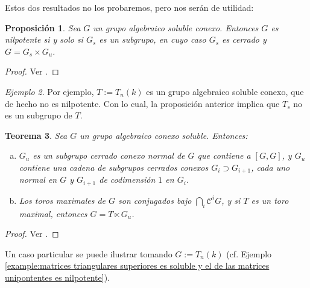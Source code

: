 \documentclass[spanish,12pt]{amsart}
\newtheorem{theorem}{Teorema}[section]
\newtheorem{proposition}[theorem]{Proposición}
\theoremstyle{definition}
\theoremstyle{remark}
\newtheorem{example}[theorem]{Ejemplo}
\numberwithin{equation}{section}
\begin{document}
Estos dos resultados no los probaremos, pero nos serán de utilidad:

\begin{proposition}\label{proposition:19.2}
Sea $G$ un grupo algebraico soluble conexo. Entonces $G$ es nilpotente si y solo si $G_s$ es un subgrupo, en cuyo caso $G_s$ es cerrado y $G = G_s \times G_u$.
\end{proposition}
\begin{proof}
Ver \cite[\S 19.2]{humphreys2012linearAlgebraicGroups}.
\end{proof}

\begin{example}\label{ejemplo:T es soluble conexo pero no nilpotente luego T_s no es un grupo}
Por ejemplo, $T := T_n (k)$ es un grupo algebraico soluble conexo, que de hecho no es nilpotente. Con lo cual, la proposición anterior implica que $T_s$ no es un subgrupo de $T$.
\end{example}

\begin{theorem}\label{th:19.3}
Sea $G$ un grupo algebraico conexo soluble. Entonces:
\begin{enumerate}[(a)]
\item $G_u$ es un subgrupo cerrado conexo normal de $G$ que contiene a $[G,G]$, y $G_u$ contiene una cadena de subgrupos cerrados conexos $G_i \supset G_{i+1}$, cada uno normal en $G$ y $G_{i+1}$ de codimensión $1$ en $G_i$.
\item Los toros maximales de $G$ son conjugados bajo $\bigcap_i \mathcal C^i G$, y si $T$ es un toro maximal, entonces $G = T \ltimes G_u$.
\end{enumerate}
\end{theorem}
\begin{proof}
Ver \cite[\S 19.3]{humphreys2012linearAlgebraicGroups}.
\end{proof}

Un caso particular se puede ilustrar tomando $G := T_n (k)$ (cf. Ejemplo \ref{example:matrices triangulares superiores es soluble y el de las matrices unipontentes es nilpotente}).
\end{document}
